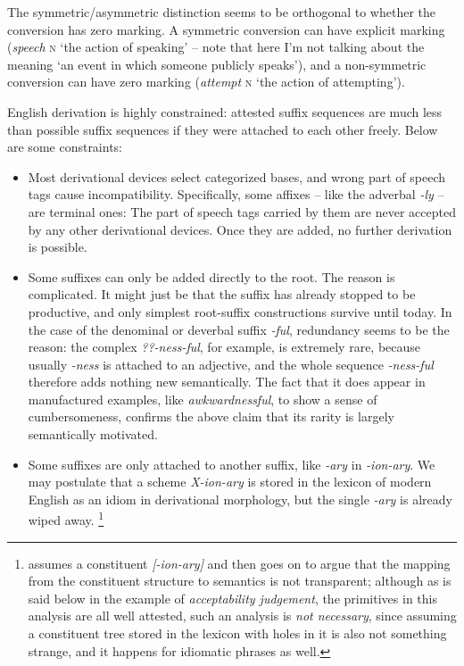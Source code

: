 \documentclass[UTF8, a4paper, oneside, scheme=plain, 12pt]{ctexbook}
\newcommand{\form}[1]{\emph{#1}}
\newcommand{\formcat}[1]{\textsc{#1}}
\newcommand{\translate}[1]{`#1'}
\begin{document}
The symmetric/asymmetric distinction seems to be orthogonal to 
whether the conversion has zero marking.
A symmetric conversion can have explicit marking
(\form{speech} \formcat{n} \translate{the action of speaking} -- 
note that here I'm not talking about the meaning \translate{an event in which someone publicly speaks}), 
and a non-symmetric conversion can have zero marking
(\form{attempt} \formcat{n} \translate{the action of attempting}).


English derivation is highly constrained:
attested suffix sequences are much less than 
possible suffix sequences 
if they were attached to each other freely.
Below are some constraints:

\begin{itemize}
    \item Most derivational devices select categorized bases,
    and wrong part of speech tags cause incompatibility.
    Specifically, some affixes -- like the adverbal \form{-ly} -- are terminal ones:
    The part of speech tags carried by them are never accepted by any other derivational devices.
    Once they are added,
    no further derivation is possible. %

    \item Some suffixes can only be added directly to the root.
    The reason is complicated.
    It might just be that the suffix has already stopped to be productive,
    and only simplest root-suffix constructions survive until today.
    In the case of the denominal or deverbal suffix \form{-ful},
    redundancy seems to be the reason:
    the complex \form{??-ness-ful},
    for example, is extremely rare,
    because usually \form{-ness} is attached to an adjective,
    and the whole sequence \form{-ness-ful} therefore adds nothing new semantically.
    The fact that it does appear in manufactured examples, like \form{awkwardnessful},
    to show a sense of cumbersomeness,
    confirms the above claim that its rarity is largely semantically motivated.

    \item Some suffixes are only attached to another suffix, 
    like \form{-ary} in \form{-ion-ary}.
    We may postulate that a scheme \form{X-ion-ary} is stored in the 
    lexicon of modern English as an idiom in derivational morphology,
    but the single \form{-ary} is already wiped away.%
    \footnote{
        \citet{fabb1988english} assumes a constituent \form{[-ion-ary]}
        and then goes on to argue that the mapping from the constituent structure 
        to semantics is not transparent;
        although as is said below in the example of 
        \form{acceptability judgement}, 
        the primitives in this analysis are all well attested,
        such an analysis is \emph{not necessary},
        since assuming a constituent tree stored in the lexicon 
        with holes in it
        is also not something strange,
        and it happens for idiomatic phrases as well.
    }


\end{itemize}
\end{document}
